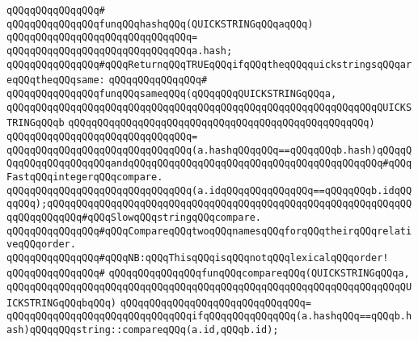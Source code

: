 \verb|qQQqqQQqqQQqqQQq#|\newline
\verb|qQQqqQQqqQQqqQQqfunqQQqhashqQQq(QUICKSTRINGqQQqaqQQq)|\newline
\verb|qQQqqQQqqQQqqQQqqQQqqQQqqQQqqQQq=|\newline
\verb|qQQqqQQqqQQqqQQqqQQqqQQqqQQqqQQqa.hash;|\newline
\newline
\newline
\newline
\verb|qQQqqQQqqQQqqQQq#qQQqReturnqQQqTRUEqQQqifqQQqtheqQQqquickstringsqQQqareqQQqtheqQQqsame:|\newline
\verb|qQQqqQQqqQQqqQQq#|\newline
\verb|qQQqqQQqqQQqqQQqfunqQQqsameqQQq(qQQqqQQqQUICKSTRINGqQQqa,|\newline
\verb|qQQqqQQqqQQqqQQqqQQqqQQqqQQqqQQqqQQqqQQqqQQqqQQqqQQqqQQqqQQqqQQqQUICKSTRINGqQQqb|\newline
\verb|qQQqqQQqqQQqqQQqqQQqqQQqqQQqqQQqqQQqqQQqqQQqqQQqqQQq)|\newline
\verb|qQQqqQQqqQQqqQQqqQQqqQQqqQQqqQQq=|\newline
\verb|qQQqqQQqqQQqqQQqqQQqqQQqqQQqqQQq(a.hashqQQqqQQq==qQQqqQQqb.hash)qQQqqQQqqQQqqQQqqQQqqQQqandqQQqqQQqqQQqqQQqqQQqqQQqqQQqqQQqqQQqqQQqqQQq#qQQqFastqQQqintegerqQQqcompare.|\newline
\verb|qQQqqQQqqQQqqQQqqQQqqQQqqQQqqQQq(a.idqQQqqQQqqQQqqQQq==qQQqqQQqb.idqQQqqQQq);qQQqqQQqqQQqqQQqqQQqqQQqqQQqqQQqqQQqqQQqqQQqqQQqqQQqqQQqqQQqqQQqqQQqqQQqqQQq#qQQqSlowqQQqstringqQQqcompare.|\newline
\newline
\newline
\newline
\verb|qQQqqQQqqQQqqQQq#qQQqCompareqQQqtwoqQQqnamesqQQqforqQQqtheirqQQqrelativeqQQqorder.|\newline
\verb|qQQqqQQqqQQqqQQq#qQQqNB:qQQqThisqQQqisqQQqnotqQQqlexicalqQQqorder!|\newline
\verb|qQQqqQQqqQQqqQQq#|\newline
\verb|qQQqqQQqqQQqqQQqfunqQQqcompareqQQq(QUICKSTRINGqQQqa,|\newline
\verb|qQQqqQQqqQQqqQQqqQQqqQQqqQQqqQQqqQQqqQQqqQQqqQQqqQQqqQQqqQQqqQQqqQQqQUICKSTRINGqQQqbqQQq)|\newline
\verb|qQQqqQQqqQQqqQQqqQQqqQQqqQQqqQQq=|\newline
\verb|qQQqqQQqqQQqqQQqqQQqqQQqqQQqqQQqifqQQqqQQqqQQqqQQq(a.hashqQQq==qQQqb.hash)qQQqqQQqstring::compareqQQq(a.id,qQQqb.id);|\newline

